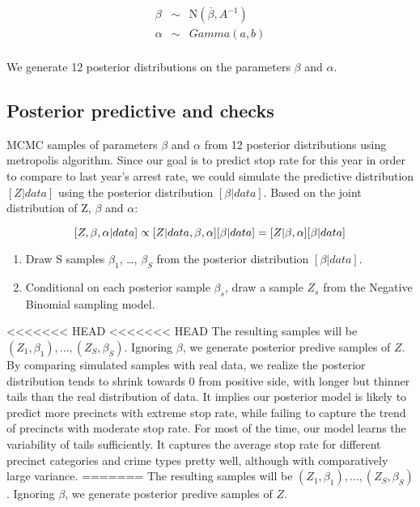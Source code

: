 \documentclass[]{article}
\providecommand{\tightlist}{%
  \setlength{\itemsep}{0pt}\setlength{\parskip}{0pt}}
\begin{document}
\[
\begin{eqnarray} 
\beta & \sim & \mathrm{N}(\overline{\beta}, A^{-1})\\
\alpha & \sim & Gamma(a,b)\\
\end{eqnarray}
\]

We generate 12 posterior distributions on the parameters \(\beta\) and
\(\alpha\).

\hypertarget{posterior-predictive-and-checks}{%
\subsection{Posterior predictive and
checks}\label{posterior-predictive-and-checks}}

MCMC samples of parameters \(\beta\) and \(\alpha\) from 12 posterior
distributions using metropolis algorithm. Since our goal is to predict
stop rate for this year in order to compare to last year's arrest rate,
we could simulate the predictive distribution \([Z|data]\) using the
posterior distribution \([\beta|data]\). Based on the joint distribution
of Z, \(\beta\) and \(\alpha\):

\[
[Z, \beta, \alpha|data] \propto [Z|data, \beta, \alpha][\beta|data]\\
=[Z|\beta, \alpha][\beta|data]
\]

\begin{enumerate}
\def\labelenumi{\arabic{enumi}.}
\tightlist
\item
  Draw S samples \(\beta_1\), \ldots{}, \(\beta_S\) from the posterior
  distribution \([\beta|data]\).
\item
  Conditional on each posterior sample \(\beta_s\), draw a sample
  \(Z_s\) from the Negative Binomial sampling model.
\end{enumerate}

<<<<<<< HEAD
\textless{}\textless{}\textless{}\textless{}\textless{}\textless{}\textless{}
HEAD The resulting samples will be
\((Z_1, \beta_1), ..., (Z_S, \beta_S)\). Ignoring \(\beta\), we generate
posterior predive samples of \(Z\). By comparing simulated samples with
real data, we realize the posterior distribution tends to shrink towards
0 from positive side, with longer but thinner tails than the real
distribution of data. It implies our posterior model is likely to
predict more precincts with extreme stop rate, while failing to capture
the trend of precincts with moderate stop rate. For most of the time,
our model learns the variability of tails sufficiently. It captures the
average stop rate for different precinct categories and crime types
pretty well, although with comparatively large variance. ======= The
resulting samples will be \((Z_1, \beta_1), ..., (Z_S, \beta_S)\).
Ignoring \(\beta\), we generate posterior predive samples of \(Z\).
\end{document}
